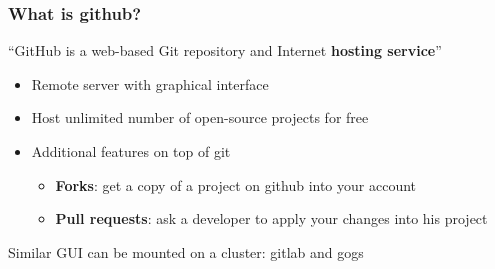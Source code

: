 \documentclass[xcolor=dvipsnames,10pt]{beamer}
\begin{document}
\begin{frame}
 \frametitle{What is github?}
 
 ``GitHub is a web-based Git repository and Internet \textbf{hosting service}''
 \vspace*{0.8cm}
 
 \begin{itemize}
  \item Remote server with graphical interface
  \vspace*{0.3cm}
 
  \item Host unlimited number of open-source projects for free
   \vspace*{0.3cm}
   
  \item Additional features on top of git
  \vspace*{0.2cm}
  
  \begin{itemize}
   \item \textbf{Forks}: get a copy of a project on github into your account
   \vspace*{0.1cm}
   
   \item \textbf{Pull requests}: ask a developer to apply your changes into his project
  \end{itemize}
 \vspace*{0.5cm}
  
 \end{itemize}
 
 Similar GUI can be mounted on a cluster: gitlab and gogs

 
\end{frame}

\addtocounter{framenumber}{-1}
\begin{frame}[t,plain]
  \titlepage
\end{frame}



% 
% 
% 
\end{document}
